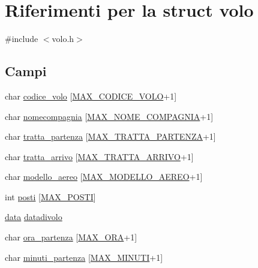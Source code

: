 \hypertarget{structvolo}{}\section{Riferimenti per la struct volo}
\label{structvolo}


{\ttfamily \#include $<$volo.\+h$>$}

\subsection*{Campi}
\begin{DoxyCompactItemize}
\item 
char \hyperlink{structvolo_a6c8757974fc1712c96a1361a1787ac3c}{codice\+\_\+volo} \mbox{[}\hyperlink{define_8h_a1811e377eb1cf22df1197a2cfa949e73}{M\+A\+X\+\_\+\+C\+O\+D\+I\+C\+E\+\_\+\+V\+O\+LO}+1\mbox{]}
\item 
char \hyperlink{structvolo_a3de88fe76ccd1e5411d940065e822316}{nomecompagnia} \mbox{[}\hyperlink{define_8h_a7d6eb3284e80ca7fa5346973e751a273}{M\+A\+X\+\_\+\+N\+O\+M\+E\+\_\+\+C\+O\+M\+P\+A\+G\+N\+IA}+1\mbox{]}
\item 
char \hyperlink{structvolo_aa4a9d235713346ceddd35b7881c2f508}{tratta\+\_\+partenza} \mbox{[}\hyperlink{define_8h_a3789b4d474f4561cdccbcd94a52e9ac2}{M\+A\+X\+\_\+\+T\+R\+A\+T\+T\+A\+\_\+\+P\+A\+R\+T\+E\+N\+ZA}+1\mbox{]}
\item 
char \hyperlink{structvolo_a4c8e5cd5b376a3bdbad447c91958f1cf}{tratta\+\_\+arrivo} \mbox{[}\hyperlink{define_8h_a05232cbd6b297f57ebd68e3b2c1e8ae2}{M\+A\+X\+\_\+\+T\+R\+A\+T\+T\+A\+\_\+\+A\+R\+R\+I\+VO}+1\mbox{]}
\item 
char \hyperlink{structvolo_aef48b36293706e7c28985152b5c0a603}{modello\+\_\+aereo} \mbox{[}\hyperlink{define_8h_ab684e2c8b65a24a7e59c9ff4b02bfd02}{M\+A\+X\+\_\+\+M\+O\+D\+E\+L\+L\+O\+\_\+\+A\+E\+R\+EO}+1\mbox{]}
\item 
int \hyperlink{structvolo_a4c44037f3356f18a3988d053140b50e6}{posti} \mbox{[}\hyperlink{define_8h_acd54e9b4d24bd6ee9734fdbda3c84b61}{M\+A\+X\+\_\+\+P\+O\+S\+TI}\mbox{]}
\item 
\hyperlink{structdata}{data} \hyperlink{structvolo_ad12757b6945cad6bb633b29d72dd58ef}{datadivolo}
\item 
char \hyperlink{structvolo_abeb76dfa2a22679f546c1d83d74c16e4}{ora\+\_\+partenza} \mbox{[}\hyperlink{define_8h_a0e20e0c8264b18234ee1c3f1eb4943f0}{M\+A\+X\+\_\+\+O\+RA}+1\mbox{]}
\item 
char \hyperlink{structvolo_ad42a90fabccc19bf3bba2ad8f392cee3}{minuti\+\_\+partenza} \mbox{[}\hyperlink{define_8h_ac5b85a4e0fdb0ecb53800fca4922a22a}{M\+A\+X\+\_\+\+M\+I\+N\+U\+TI}+1\mbox{]}

\end{DoxyCompactItemize}
